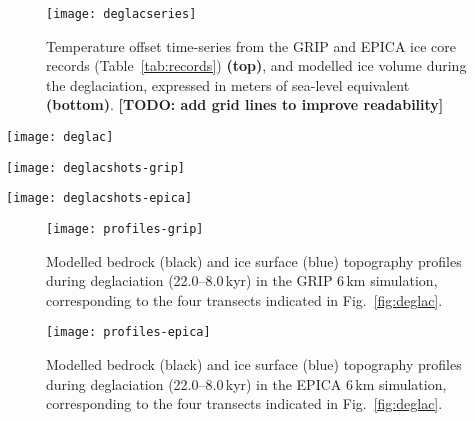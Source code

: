 \documentclass[tc, manuscript]{copernicus}
\newcommand{\todo}[1]{\textbf{[TODO: #1]}}
\begin{document}
\begin{figure}
  \texttt{[image: deglacseries]}
  \caption{Temperature offset time-series from the GRIP and EPICA ice core
           records (Table~\ref{tab:records}) \textbf{(top)}, and modelled ice
           volume during the deglaciation, expressed in meters of sea-level
           equivalent \textbf{(bottom)}.
           \todo{add grid lines to improve readability}}
  \label{fig:deglacseries}
\end{figure}

\begin{figure*}
  \texttt{[image: deglac]}
  \caption{Modelled age of the last deglaciation. Areas where the MIS~4 glacial
           advance exceeded the last glacial maximum advanced are marked in
           green. Hatches denote the Younger Dryas re-advance, which is more
           pronounced in the GRIP-driven simulation.}
  \label{fig:deglac}
\end{figure*}

\begin{figure*}
  \texttt{[image: deglacshots-grip]}
  \caption{Snapshots of modelled surface topography (200\,m contours)
           and surface velocity (colour mapping) from the GRIP simulation,
           corresponding to the last glacial ice volume maximum (-19.1 kyr) and
           the last deglaciation.}
  \label{fig:deglacshots-grip}
\end{figure*}

\begin{figure*}
  \texttt{[image: deglacshots-epica]}
  \caption{Snapshots of modelled surface topography (200\,m contours)
           and surface velocity (colour mapping) from the EPICA simulation,
           corresponding to the last glacial ice volume maximum (-17.3 kyr) and
           the last deglaciation.}
  \label{fig:deglacshots-epica}
\end{figure*}


\begin{figure}
  \texttt{[image: profiles-grip]}
  \caption{Modelled bedrock (black) and ice surface (blue) topography profiles
           during deglaciation (22.0--8.0\,kyr) in the GRIP 6\,km
           simulation, corresponding to the four transects indicated in
           Fig.~\ref{fig:deglac}.}
  \label{fig:profiles-grip}
\end{figure}

\begin{figure}
  \texttt{[image: profiles-epica]}
  \caption{Modelled bedrock (black) and ice surface (blue) topography profiles
           during deglaciation (22.0--8.0\,kyr) in the EPICA 6\,km
           simulation, corresponding to the four transects indicated in
           Fig.~\ref{fig:deglac}.}
  \label{fig:profiles-epica}
\end{figure}
\end{document}
